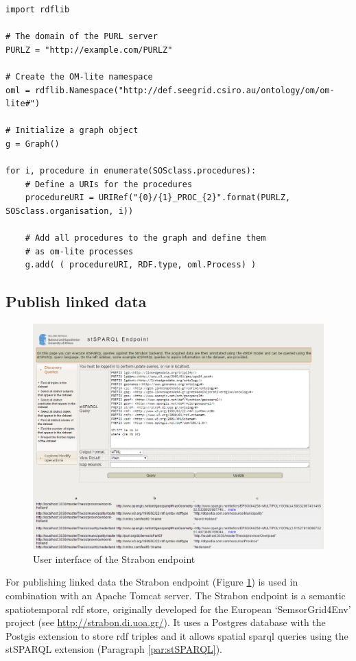 \begin{lstlisting}[float,caption={Creating an RDF graph object with the Python package RDFlib}, label={lst:rdflib}]
import rdflib

# The domain of the PURL server
PURLZ = "http://example.com/PURLZ"

# Create the OM-lite namespace 
oml = rdflib.Namespace("http://def.seegrid.csiro.au/ontology/om/om-lite#")

# Initialize a graph object
g = Graph()

for i, procedure in enumerate(SOSclass.procedures):
	# Define a URIs for the procedures
	procedureURI = URIRef("{0}/{1}_PROC_{2}".format(PURLZ, SOSclass.organisation, i))
	
	# Add all procedures to the graph and define them   
	# as om-lite processes
	g.add( ( procedureURI, RDF.type, oml.Process) )

\end{lstlisting}  

\subsection{Publish linked data}

\begin{figure}
	\centering
	\includegraphics[width=\linewidth]{figs/Strabon.PNG}
	\caption{User interface of the Strabon endpoint}
	\label{fig:Strabon}
\end{figure}

For publishing linked data the Strabon endpoint (Figure \ref{fig:Strabon}) is used in combination with an Apache Tomcat server. The Strabon endpoint is a semantic spatiotemporal \ac{rdf} store, originally developed for the European  `SemsorGrid4Env' project (see \url{http://strabon.di.uoa.gr/}). It uses a Postgres database with the Postgis extension to store \ac{rdf} triples and it allows spatial \ac{sparql} queries using the stSPARQL extension (Paragraph \ref{par:stSPARQL}).  

